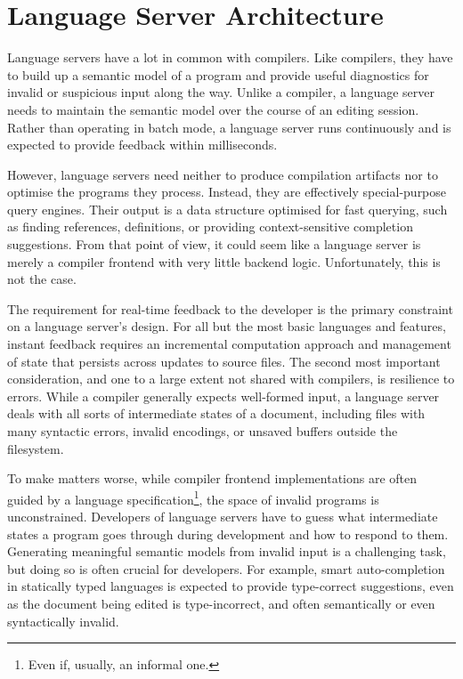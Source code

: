 \chapter{Language Server Architecture}

Language servers have a lot in common with compilers. Like compilers, they have
to build up a semantic model of a program and provide useful diagnostics for
invalid or suspicious input along the way. Unlike a compiler, a language server
needs to maintain the semantic model over the course of an editing session.
Rather than operating in batch mode, a language server runs continuously and is
expected to provide feedback within milliseconds.

However, language servers need neither to produce compilation artifacts nor to
optimise the programs they process. Instead, they are effectively
special-purpose query engines. Their output is a data structure optimised for
fast querying, such as finding references, definitions, or providing
context-sensitive completion suggestions. From that point of view, it could seem
like a language server is merely a compiler frontend with very little backend logic.
Unfortunately, this is not the case.

The requirement for real-time feedback to the developer is the primary
constraint on a language server's design. For all but the most basic languages
and features, instant feedback requires an incremental computation approach and
management of state that persists across updates to source files. The second
most important consideration, and one to a large extent not shared with
compilers, is resilience to errors. While a compiler generally expects
well-formed input, a language server deals with all sorts of intermediate states
of a document, including files with many syntactic errors, invalid encodings, or
unsaved buffers outside the filesystem.

To make matters worse, while compiler frontend implementations are often guided
by a language specification\footnote{Even if, usually, an informal one.}, the
space of invalid programs is unconstrained. Developers of language servers have
to guess what intermediate states a program goes through during development and
how to respond to them. Generating meaningful semantic models from invalid input
is a challenging task, but doing so is often crucial for developers. For
example, smart auto-completion in statically typed languages is expected to
provide type-correct suggestions, even as the document being edited is
type-incorrect, and often semantically or even syntactically invalid.

